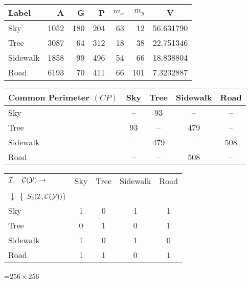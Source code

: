 {\newpage
\clearpage
\samepage \begin{table}\begin{center}
\begin{tabular}{||l||r|r|r|r|r|c||} \hline 
Label    & A  & G  &  P & $m_x$ & $m_y$ &  V \\  \hline \hline
Sky    &1052& 180& 204& 63    & 12    & 56.631790 \\ 
Tree    &3087& 64 & 312& 18    & 38    & 22.751346 \\  
Sidewalk&1858& 99 & 496& 54    & 66    & 18.838804 \\ 
Road     &6193& 70 & 411& 66    & 101   & 7.3232887  \\  \hline
\end{tabular}

\vspace{2ex}
 

\begin{tabular}{||l||c|c|c|c||} \hline
Common Perimeter $(CP)$& Sky  &Tree  &Sidewalk&Road \\  \hline \hline
           Sky  & --   & 93  & --    &-- \\ 
         Tree   & 93   & --  & 479    & -- \\ 
      Sidewalk  & --  & 479  & --     &508 \\ 
           Road & --   & --  & 508    & --\\  \hline
\end{tabular}

\vspace{2ex}
 

\begin{tabular}{||l||c|c|c|c||} \hline
${\cal I}
 ,\;\;\; {\cal{C(Y)}}
  \rightarrow$& Sky  &Tree  &Sidewalk&Road \\ 
$\downarrow$ \{ $S_c({\cal I}
 ,{\cal{C(Y)}}
 ) \}$&&&&
\\  \hline \hline
           Sky  & 1   & 0  & 1    & 1 \\ 
         Tree   & 0   & 1  & 0    & 1 \\ 
      Sidewalk  & 1  & 0 & 1     &0 \\ 
           Road & 1   & 1  & 0    & 1\\  \hline
\end{tabular}
\end{center}  
 \label{tab:road}
\end{table}
}

{\newpage
\clearpage
\samepage \setbox\sizebox=\hbox{$256 \times 256$}\box\sizebox
}


